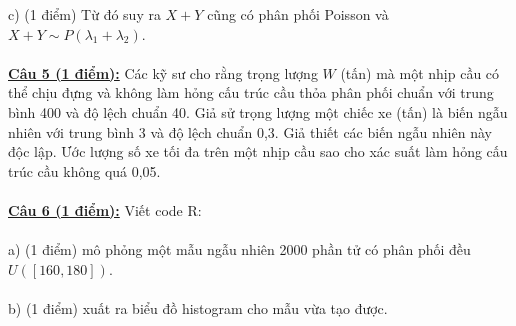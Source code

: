 \documentclass[10pt, a4paper]{article}
\begin{document}
\color{red}c) (1 điểm) \color{black}Từ đó suy ra $X+Y$ cũng có phân phối Poisson và $X+Y\sim P(\lambda_1+\lambda_2)$.\\\\
\color{red}\underline{\textbf{Câu 5 (1 điểm):}} \color{black}Các kỹ sư cho rằng trọng lượng $W$ (tấn) mà một nhịp cầu có thể chịu đựng và không làm hỏng cấu trúc cầu thỏa phân phối chuẩn với trung bình 400 và độ lệch chuẩn 40. Giả sử trọng lượng một chiếc xe (tấn) là biến ngẫu nhiên với trung bình 3 và độ lệch chuẩn 0,3. Giả thiết các biến ngẫu nhiên này độc lập. Ước lượng số xe tối đa trên một nhịp cầu sao cho xác suất làm hỏng cấu trúc cầu không quá 0,05.\\\\
\color{red}\underline{\textbf{Câu 6 (1 điểm):}} \color{black}Viết code R:\\\\
\color{red}a) (1 điểm) \color{black}mô phỏng một mẫu ngẫu nhiên 2000 phần tử có phân phối đều $U([160,180])$.\\\\
\color{red}b) (1 điểm) \color{black}xuất ra biểu đồ histogram cho mẫu vừa tạo được.

\newpage
\end{document}
